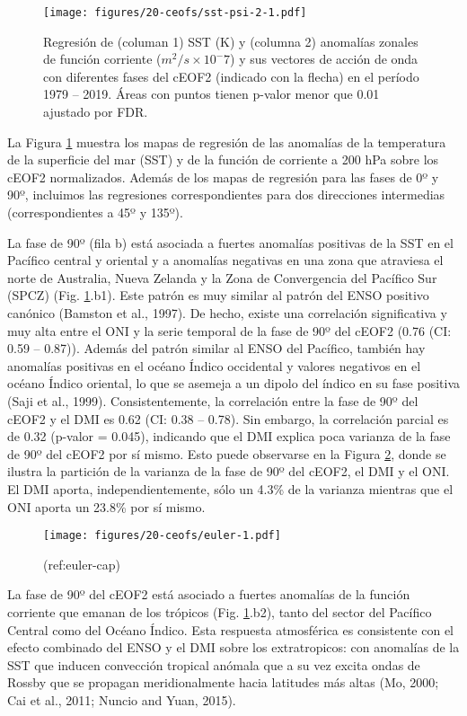 \documentclass[12pt,oneside]{reedthesis}
\begin{document}
\begin{figure}
\centering
\texttt{[image: figures/20-ceofs/sst-psi-2-1.pdf]}
\caption{\label{fig:sst-psi-2}Regresión de (columan 1) SST (K) y (columna 2) anomalías zonales de función corriente (\(m^2/s\times10^-7\)) y sus vectores de acción de onda con diferentes fases del cEOF2 (indicado con la flecha) en el período 1979 -- 2019.
Áreas con puntos tienen p-valor menor que 0.01 ajustado por FDR.}
\end{figure}
La Figura \ref{fig:sst-psi-2} muestra los mapas de regresión de las anomalías de la temperatura de la superficie del mar (SST) y de la función de corriente a 200 hPa sobre los cEOF2 normalizados.
Además de los mapas de regresión para las fases de 0º y 90º, incluimos las regresiones correspondientes para dos direcciones intermedias (correspondientes a 45º y 135º).

La fase de 90º (fila b) está asociada a fuertes anomalías positivas de la SST en el Pacífico central y oriental y a anomalías negativas en una zona que atraviesa el norte de Australia, Nueva Zelanda y la Zona de Convergencia del Pacífico Sur (SPCZ) (Fig. \ref{fig:sst-psi-2}.b1).
Este patrón es muy similar al patrón del ENSO positivo canónico (Bamston et al., 1997).
De hecho, existe una correlación significativa y muy alta entre el ONI y la serie temporal de la fase de 90º del cEOF2 (0.76 (CI: 0.59 -- 0.87)).
Además del patrón similar al ENSO del Pacífico, también hay anomalías positivas en el océano Índico occidental y valores negativos en el océano Índico oriental, lo que se asemeja a un dipolo del índico en su fase positiva (Saji et al., 1999).
Consistentemente, la correlación entre la fase de 90º del cEOF2 y el DMI es 0.62 (CI: 0.38 -- 0.78).
Sin embargo, la correlación parcial es de 0.32 (p-valor = 0.045), indicando que el DMI explica poca varianza de la fase de 90º del cEOF2 por sí mismo.
Esto puede observarse en la Figura \ref{fig:euler}, donde se ilustra la partición de la varianza de la fase de 90º del cEOF2, el DMI y el ONI.
El DMI aporta, independientemente, sólo un 4.3\% de la varianza mientras que el ONI aporta un 23.8\% por sí mismo.


\begin{figure}
\centering
\texttt{[image: figures/20-ceofs/euler-1.pdf]}
\caption{\label{fig:euler}(ref:euler-cap)}
\end{figure}
La fase de 90º del cEOF2 está asociado a fuertes anomalías de la función corriente que emanan de los trópicos (Fig. \ref{fig:sst-psi-2}.b2), tanto del sector del Pacífico Central como del Océano Índico.
Esta respuesta atmosférica es consistente con el efecto combinado del ENSO y el DMI sobre los extratropicos: con anomalías de la SST que inducen convección tropical anómala que a su vez excita ondas de Rossby que se propagan meridionalmente hacia latitudes más altas (Mo, 2000; Cai et al., 2011; Nuncio and Yuan, 2015).
\end{document}
